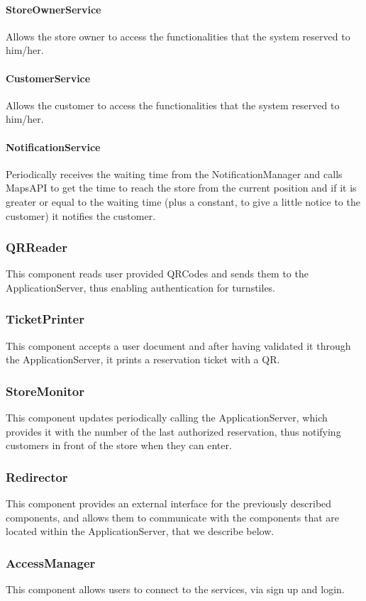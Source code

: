 \paragraph{StoreOwnerService}Allows the store owner to access the functionalities that the system reserved to him/her.
\paragraph{CustomerService}Allows the customer to access the functionalities that the system reserved to him/her.
\paragraph{NotificationService}Periodically receives the waiting time from the NotificationManager and calls MapsAPI to get the time to reach the store from the current position and if it is greater or equal to the waiting time (plus a constant, to give a little notice to the customer) it notifies the customer.
\subsubsection{QRReader}
This component reads user provided QRCodes and sends them to the ApplicationServer, thus enabling authentication for turnstiles.
\subsubsection{TicketPrinter}
This component accepts a user document and after having validated it through the ApplicationServer, it prints a reservation ticket with a QR.
\subsubsection{StoreMonitor}
This component updates periodically calling the ApplicationServer, which provides it with the number of the last authorized reservation, thus notifying customers in front of the store when they can enter.
\subsubsection{Redirector}
This component provides an external interface for the previously described components, and allows them to communicate with the components that are located within the ApplicationServer, that we describe below.
\subsubsection{AccessManager}
This component allows users to connect to the services, via sign up and login.
